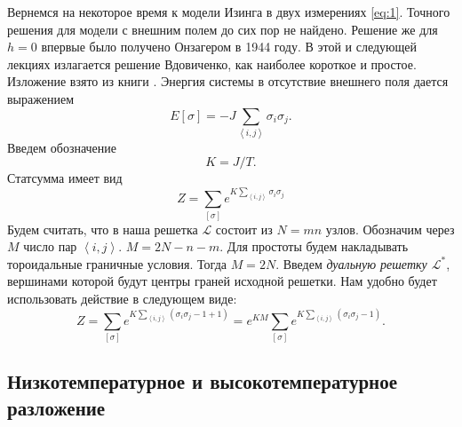 \documentclass[a4paper,12pt]{article}
\theoremstyle{definition}
\theoremstyle{definition}
\theoremstyle{definition}
\begin{document}
Вернемся на некоторое время к модели Изинга в двух измерениях \eqref{eq:1}. Точного решения для модели с внешним полем до сих пор не найдено. Решение же для $h=0$ впервые было получено Онзагером в 1944 году. В этой и следующей лекциях излагается решение Вдовиченко, как наиболее короткое и простое. Изложение взято из книги \cite{belavin2001lect}.
Энергия системы в отсутствие внешнего поля дается выражением
\begin{equation}
  \label{eq:98}
  E[\sigma]=-J\sum_{\left<i,j\right>}\sigma_i \sigma_j .
\end{equation}
Введем обозначение
\begin{equation}
  \label{eq:99}
  K=J/T.
\end{equation}
Статсумма имеет вид
\begin{equation}
  \label{eq:100}
  Z=\sum_{[\sigma]}e^{K\sum_{\left<i,j\right>}\sigma_i\sigma_j}
\end{equation}
Будем считать, что в наша решетка $\mathcal{L}$ состоит из $N=mn$ узлов. Обозначим через $M$ число пар $\left<i,j\right>$. $M=2N-n-m$. Для простоты будем накладывать тороидальные граничные условия. Тогда $M=2N$. Введем {\it дуальную решетку $\mathcal{L}^*$}, вершинами которой будут центры граней исходной решетки. 
Нам удобно будет использовать действие в следующем виде:
\begin{equation}
  \label{eq:101}
  Z=\sum_{[\sigma]}e^{K\sum_{\left<i,j\right>}(\sigma_i\sigma_j-1+1)}=e^{KM} \sum_{[\sigma]}e^{K\sum_{\left<i,j\right>}(\sigma_i\sigma_j-1)}.
\end{equation}

\subsection{Низкотемпературное и высокотемпературное разложение}
\label{sec:low-high-temp}
\end{document}
